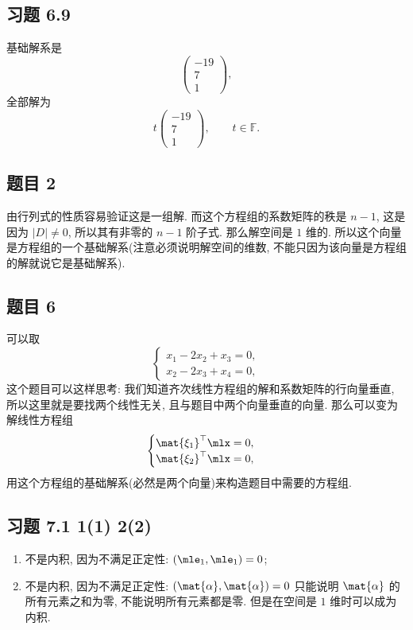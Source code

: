 \subsection*{ 习题 6.9 }
\begin{solution}
基础解系是
\[
    \left(\begin{matrix}
        -19 \\
        7 \\
        1
        \end{matrix}\right),
\]
全部解为
\[
    t\left(\begin{matrix}
        -19 \\
        7 \\
        1
        \end{matrix}\right), \qquad t \in \mathbb{F}.
\]
\end{solution}

\subsection*{ 题目 2 }
\begin{solution}
由行列式的性质容易验证这是一组解. 而这个方程组的系数矩阵的秩是 $n - 1$, 这是因为 $|D|\not= 0$, 所以其有非零的 $n - 1$ 阶子式. 那么解空间是 $1$ 维的. 所以这个向量是方程组的一个基础解系(注意必须说明解空间的维数, 不能只因为该向量是方程组的解就说它是基础解系).
\end{solution}

\subsection*{ 题目 6 }
\begin{solution}
可以取
\[
\begin{cases}
    x_1 - 2x_2 + x_3 = 0, \\
    x_2 - 2x_3 + x_4 = 0,
\end{cases}
\]
这个题目可以这样思考: 我们知道齐次线性方程组的解和系数矩阵的行向量垂直, 所以这里就是要找两个线性无关, 且与题目中两个向量垂直的向量. 那么可以变为解线性方程组
\[
\begin{cases}
    \mat{\xi_1}^{\top}\mlx = 0, \\
    \mat{\xi_2}^{\top}\mlx = 0,
\end{cases}
\]
用这个方程组的基础解系(必然是两个向量)来构造题目中需要的方程组.
\end{solution}

\subsection*{ 习题 7.1 1(1) 2(2)}
\begin{solution}
\begin{enumerate}
    \item 不是内积, 因为不满足正定性: $(\mle_1, \mle_1) = 0$;
    \item 不是内积, 因为不满足正定性: $(\mat{\alpha}, \mat{\alpha}) = 0$ 只能说明 $\mat{\alpha}$ 的所有元素之和为零, 不能说明所有元素都是零. 但是在空间是 $1$ 维时可以成为内积.
\end{enumerate}
\end{solution}